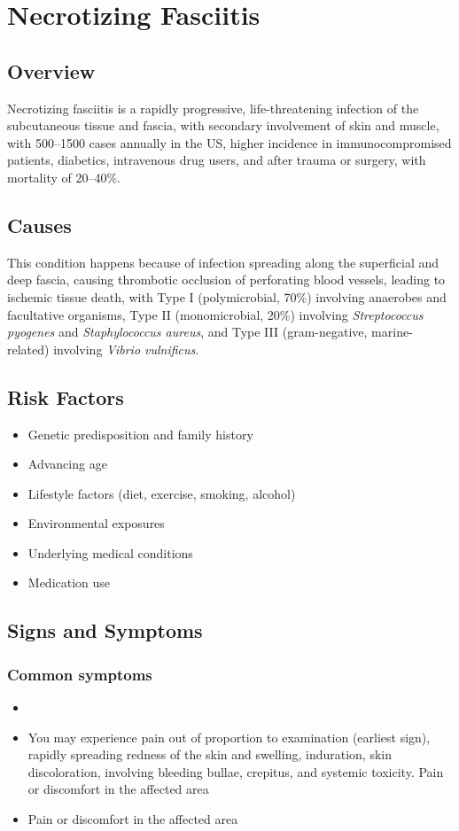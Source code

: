 \chapter{Necrotizing Fasciitis}
\label{sec:Necrotizing Fasciitis}

\section{Overview}
Necrotizing fasciitis is a rapidly progressive, life-threatening infection of the subcutaneous tissue and fascia, with secondary involvement of skin and muscle, with 500--1500 cases annually in the US, higher incidence in immunocompromised patients, diabetics, intravenous drug users, and after trauma or surgery, with mortality of 20--40\%.
\section{Causes}
This condition happens because of infection spreading along the superficial and deep fascia, causing thrombotic occlusion of perforating blood vessels, leading to ischemic tissue death, with Type I (polymicrobial, 70\%) involving anaerobes and facultative organisms, Type II (monomicrobial, 20\%) involving \textit{Streptococcus pyogenes} and \textit{Staphylococcus aureus}, and Type III (gram-negative, marine-related) involving \textit{Vibrio vulnificus}.     
\section{Risk Factors}

\begin{itemize}[noitemsep]
  \item Genetic predisposition and family history
  \item Advancing age
  \item Lifestyle factors (diet, exercise, smoking, alcohol)
  \item Environmental exposures
  \item Underlying medical conditions
  \item Medication use
\end{itemize}
\section{Signs and Symptoms}

\subsection{Common symptoms}
\begin{itemize}[noitemsep]
  \item \item You may experience pain out of proportion to examination (earliest sign), rapidly spreading redness of the skin and swelling, induration, skin discoloration, involving bleeding bullae, crepitus, and systemic toxicity. Pain or discomfort in the affected area    \item Pain or discomfort in the affected area
  \end{itemize}

